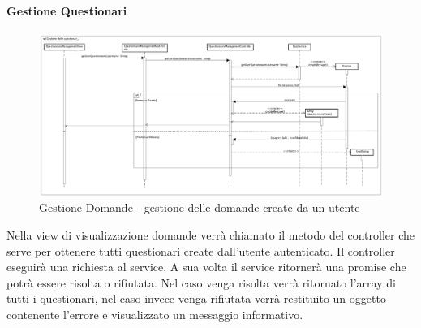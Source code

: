 \paragraph{Gestione Questionari}

\label{Gestione Questionari - gestione del recupero dei questionari di un utente}

\begin{figure}[ht]
	\centering
	\includegraphics[scale=0.25,keepaspectratio]{UML/DiagrammiDiSequenza/Front-end/QuestionnaireManagement.png}
	\caption{Gestione Domande - gestione delle domande create da un utente}
\end{figure} \FloatBarrier

Nella view di visualizzazione domande verrà chiamato il metodo del controller che serve per ottenere tutti questionari create dall'utente autenticato. Il controller eseguirà una richiesta al service. A sua volta il service ritornerà una promise che potrà essere risolta o rifiutata. Nel caso venga risolta verrà ritornato l'array di tutti i questionari, nel caso invece venga rifiutata verrà restituito un oggetto contenente l'errore e visualizzato un messaggio informativo. 
